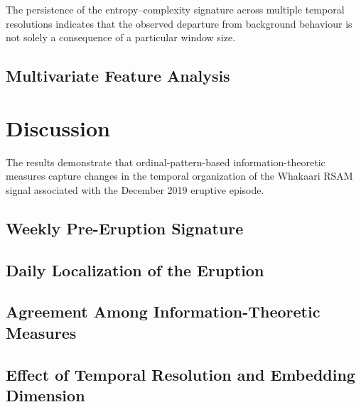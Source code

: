 \documentclass[journal]{IEEEtran}
\begin{document}
	The persistence of the entropy--complexity signature across
	multiple temporal resolutions indicates that the observed
	departure from background behaviour is not solely a consequence
	of a particular window size.
	
	
	\subsection{Multivariate Feature Analysis}
	
	
	
	\section{Discussion}
	
	The results demonstrate that ordinal-pattern-based
	information-theoretic measures capture changes in the temporal
	organization of the Whakaari RSAM signal associated with the
	December 2019 eruptive episode.
	
	\subsection{Weekly Pre-Eruption Signature}
	
	
	
	\subsection{Daily Localization of the Eruption}
	
	
	
	\subsection{Agreement Among Information-Theoretic Measures}
	
	
	
	\subsection{Effect of Temporal Resolution and Embedding Dimension}
	
\end{document}
